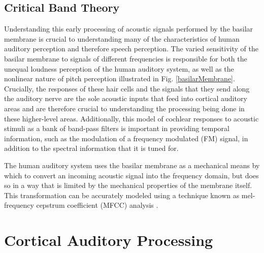 \documentclass[titlepage]{article}
\begin{document}
  \subsection{Critical Band Theory}

    Understanding this early processing of acoustic signals performed by the
    basilar membrane is crucial to understanding many of the characteristics
    of human auditory perception and therefore speech perception. The varied
    sensitivity of the basilar membrane to signals of different frequencies
    is responsible for both the unequal loudness perception of the human
    auditory system, as well as the nonlinear nature of pitch perception
    illustrated in Fig. \ref{basilarMembrane}. Crucially,
    the responses of these hair cells and the signals that they send along the auditory nerve are the sole
    acoustic inputs that feed into cortical auditory areas and are therefore crucial to understanding
    the processing being done in these higher-level areas. Additionally, this model of cochlear responses to
    acoustic stimuli as a bank of band-pass filters is important in providing temporal information, such
    as the modulation of a frequency modulated (FM) signal, in addition to the spectral information that it
    is tuned for.

    The human auditory system uses the basilar membrane as a mechanical
    means by which to convert an incoming acoustic signal into the frequency
    domain, but does so in a way that is limited by the mechanical properties
    of the membrane itself. This transformation can be accurately modeled using a
    technique known as mel-frequency cepstrum coefficient (MFCC) analysis \cite{Davis1980,Noll1967}.

\section{Cortical Auditory Processing} \label{corticalAuditoryProcessing}
\end{document}
